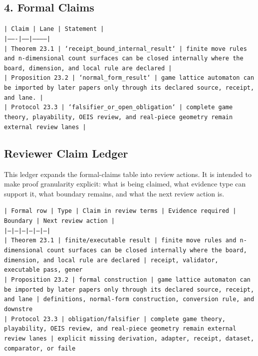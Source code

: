 \documentclass[11pt]{article}
\begin{document}
\subsection*{4. Formal Claims}

\noindent\texttt{| Claim | Lane | Statement |}\\
\noindent\texttt{|-------|------|-----------|}\\
\noindent\texttt{| Theorem 23.1 | `receipt\_bound\_internal\_result` | finite move rules and n-dimensional count surfaces can be closed internally where the board, dimension, and local rule are declared |}\\
\noindent\texttt{| Proposition 23.2 | `normal\_form\_result` | game lattice automaton can be imported by later papers only through its declared source, receipt, and lane. |}\\
\noindent\texttt{| Protocol 23.3 | `falsifier\_or\_open\_obligation` | complete game theory, playability, OEIS review, and real-piece geometry remain external review lanes |}\\

\subsection*{Reviewer Claim Ledger}

This ledger expands the formal-claims table into review actions. It is intended to make proof granularity explicit: what is being claimed, what evidence type can support it, what boundary remains, and what the next review action is.

\noindent\texttt{| Formal row | Type | Claim in review terms | Evidence required | Boundary | Next review action |}\\
\noindent\texttt{|---|---|---|---|---|---|}\\
\noindent\texttt{| Theorem 23.1 | finite/executable result | finite move rules and n-dimensional count surfaces can be closed internally where the board, dimension, and local rule are declared | receipt, validator, executable pass, gener}\\
\noindent\texttt{| Proposition 23.2 | formal construction | game lattice automaton can be imported by later papers only through its declared source, receipt, and lane | definitions, normal-form construction, conversion rule, and downstre}\\
\noindent\texttt{| Protocol 23.3 | obligation/falsifier | complete game theory, playability, OEIS review, and real-piece geometry remain external review lanes | explicit missing derivation, adapter, receipt, dataset, comparator, or faile}\\
\end{document}
